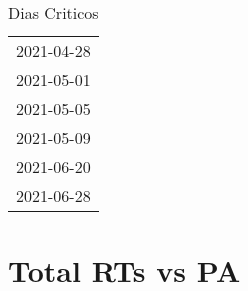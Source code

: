 \documentclass[
]{article}
\author{}
\date{\vspace{-2.5em}}
\begin{document}
\begin{table}[H]
    \centering
    \caption{Dias Criticos}
    \label{tab:dias_criticos}
    \begin{tabular}{c}
        \toprule
          2021-04-28 \\
          2021-05-01 \\
          2021-05-05 \\ 
          2021-05-09 \\
          2021-06-20 \\
          2021-06-28 \\
        \bottomrule
    \end{tabular}
\end{table}

\tableofcontents
\newpage
\section{Total RTs vs PA}
\end{document}
